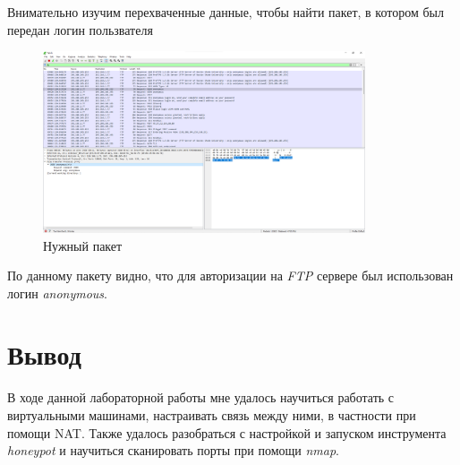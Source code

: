 \documentclass[a4paper]{article}
\begin{document}
  Внимательно изучим перехваченные данные, чтобы найти пакет, в котором
  был передан логин пользвателя
  \begin{figure}[H]
    \centering 
    \includegraphics[width=0.85\textwidth]{01_00 (49)}
    \caption{Нужный пакет}
  \end{figure}

  По данному пакету видно, что для авторизации на \textit{FTP} сервере был использован
  логин \textit{anonymous}.

  \section{Вывод}

  В ходе данной лабораторной работы мне удалось научиться работать с виртуальными машинами,
  настраивать связь между ними, в частности при помощи NAT. Также удалось разобраться
  с настройкой и запуском инструмента \textit{honeypot} и научиться сканировать
  порты при помощи \textit{nmap}.
\end{document}
